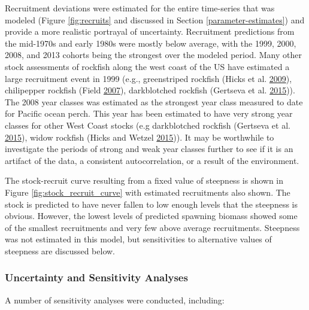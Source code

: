 \documentclass[12pt,]{article}
\begin{document}
Recruitment deviations were estimated for the entire time-series that
was modeled (Figure \ref{fig:recruits} and discussed in Section
\ref{parameter-estimates}) and provide a more realistic portrayal of
uncertainty. Recruitment predictions from the mid-1970s and early 1980s
were mostly below average, with the 1999, 2000, 2008, and 2013 cohorts
being the strongest over the modeled period. Many other stock
assessments of rockfish along the west coast of the US have estimated a
large recruitment event in 1999 (e.g., greenstriped rockfish (Hicks et
al. \protect\hyperlink{ref-hicks_status_2009}{2009}), chilipepper
rockfish (Field \protect\hyperlink{ref-field_status_2007}{2007}),
darkblotched rockfish (Gertseva et al.
\protect\hyperlink{ref-gertseva_status_2015}{2015})). The 2008 year
classes was estimated as the strongest year class measured to date for
Pacific ocean perch. This year has been estimated to have very strong
year classes for other West Coast stocks (e.g darkblotched rockfish
(Gertseva et al. \protect\hyperlink{ref-gertseva_status_2015}{2015}),
widow rockfish (Hicks and Wetzel
\protect\hyperlink{ref-hicks_status_2015}{2015})). It may be worthwhile
to investigate the periods of strong and weak year classes further to
see if it is an artifact of the data, a consistent autocorrelation, or a
result of the environment.

The stock-recruit curve resulting from a fixed value of steepness is
shown in Figure \ref{fig:stock_recruit_curve} with estimated
recruitments also shown. The stock is predicted to have never fallen to
low enough levels that the steepness is obvious. However, the lowest
levels of predicted spawning biomass showed some of the smallest
recruitments and very few above average recruitments. Steepness was not
estimated in this model, but sensitivities to alternative values of
steepness are discussed below.

\subsubsection{Uncertainty and Sensitivity
Analyses}\label{uncertainty-and-sensitivity-analyses}

A number of sensitivity analyses were conducted, including:
\end{document}
